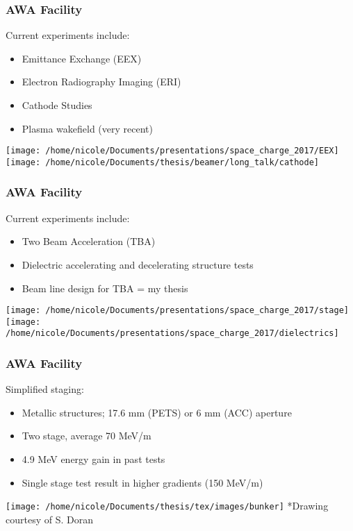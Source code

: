 \documentclass[professionalfonts,t]{beamer}
\begin{document}
\begin{frame}
\frametitle{AWA Facility}
Current experiments include:
\begin{itemize}
	\item{Emittance Exchange (EEX)}
	\item{Electron Radiography Imaging (ERI)}
	\item{Cathode Studies}
	\item Plasma wakefield (very recent)
\end{itemize}
\vspace{0.3cm}
\centering
\texttt{[image: /home/nicole/Documents/presentations/space\_charge\_2017/EEX]}\hspace{0.5em}%
\texttt{[image: /home/nicole/Documents/thesis/beamer/long\_talk/cathode]}
\end{frame}


\begin{frame}
\frametitle{AWA Facility}
Current experiments include:
\begin{itemize}
	\item{Two Beam Acceleration (TBA)}
	\item{Dielectric accelerating and decelerating structure tests}
	\item{Beam line design for TBA = my thesis}
\end{itemize}
\vspace{0.5cm}
\texttt{[image: /home/nicole/Documents/presentations/space\_charge\_2017/stage]}\hfill\texttt{[image: /home/nicole/Documents/presentations/space\_charge\_2017/dielectrics]}
\end{frame}


\begin{frame}
\frametitle{AWA Facility}
Simplified staging:
\begin{itemize}
	\item Metallic structures; 17.6 mm (PETS) or 6 mm (ACC) aperture
	\item Two stage, average 70 MeV/m 
	\item 4.9 MeV energy gain in past tests 
	\item Single stage test result in higher gradients (150 MeV/m)
\end{itemize}

\vspace{0.5em}

\texttt{[image: /home/nicole/Documents/thesis/tex/images/bunker]}
\tiny{*Drawing courtesy of S. Doran}
\end{frame}
\end{document}
